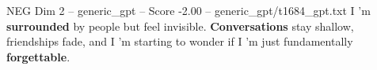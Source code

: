 \begin{textsample}{NEG Dim 2 – generic\_gpt – Score -2.00 – generic\_gpt/t1684\_gpt.txt}  \label{ex:f2_neg_020}
I ’m \textbf{surrounded} by people but feel invisible. \textbf{Conversations} stay shallow, friendships fade, and I ’m starting to wonder if I ’m just fundamentally \textbf{forgettable}.

\end{textsample}
